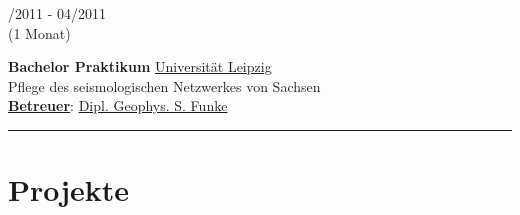\documentclass{article}
\newcommand{\spacingWork}{0.25cm}
\begin{document}
\begin{minipage}[t]{0.69\textwidth}
\begin{minipage}[t]{0.99\textwidth}
		\vspace{\spacingWork}
		
				\begin{minipage}[t]{0.2\textwidth}
				/2011 -  04/2011\\(1 Monat)
				\end{minipage}
				\hfill
				\begin{minipage}[t]{0.75\textwidth}
				\textbf{Bachelor Praktikum}\hfill
				\href{http://geologie.physgeo.uni-leipzig.de}{\color{pblue}Universität Leipzig}\\
				Pflege des seismologischen Netzwerkes von Sachsen\\
				\textbf{\underline{Betreuer}}: \href{mailto:sfunke@rz.uni-leipzig.de}{\color{pblue}Dipl. Geophys. S. Funke}
			\end{minipage}		
	\end{minipage}
	\vspace{\spacingWork}
		\hrule
		
		\section*{\fontsize{18pt}{24pt}\selectfont \color{pblue} Projekte}


\end{minipage}
\end{document}
